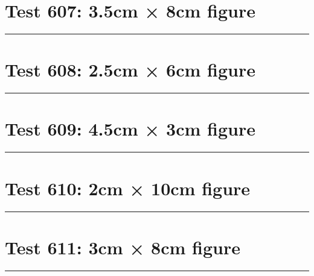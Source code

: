 \documentclass[a4paper,11pt]{article}
\begin{document}
\section*{Test 607: 3.5cm × 8cm figure}
\begin{swarmwrap}%
  \begin{minipage}[t]{3cm}
    \centering
    \rule{\linewidth}{8cm}
  \end{minipage}%
\end{swarmwrap}%
\swarmwrapnext
\lipsum[101]
\lipsum[102]
\lipsum[103]
\lipsum[104]
\section*{Test 608: 2.5cm × 6cm figure}
\begin{swarmwrap}%
  \begin{minipage}[t]{2cm}
    \centering
    \rule{\linewidth}{6cm}
  \end{minipage}%
\end{swarmwrap}%
\swarmwrapnext
\lipsum[86]
\lipsum[87]
\lipsum[88]
\lipsum[89]
\section*{Test 609: 4.5cm × 3cm figure}
\begin{swarmwrap}%
  \begin{minipage}[t]{4cm}
    \centering
    \rule{\linewidth}{3cm}
  \end{minipage}%
\end{swarmwrap}%
\swarmwrapnext
\lipsum[96]
\lipsum[97]
\lipsum[98]
\lipsum[99]
\lipsum[100]
\lipsum[101]
\section*{Test 610: 2cm × 10cm figure}
\begin{swarmwrap}%
  \begin{minipage}[t]{2cm}
    \centering
    \rule{\linewidth}{10cm}
  \end{minipage}%
\end{swarmwrap}%
\swarmwrapnext
\lipsum[15]
\lipsum[16]
\lipsum[17]
\lipsum[18]
\section*{Test 611: 3cm × 8cm figure}
\begin{swarmwrap}%
  \begin{minipage}[t]{3cm}
    \centering
    \rule{\linewidth}{8cm}
  \end{minipage}%
\end{swarmwrap}%
\swarmwrapnext
\lipsum[20]
\lipsum[21]
\lipsum[22]
\end{document}
